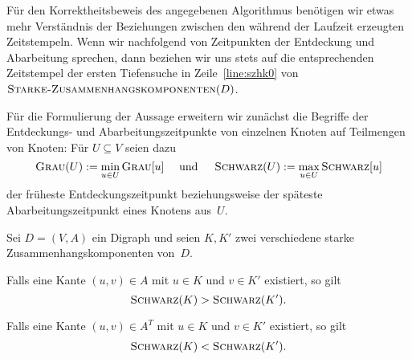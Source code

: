 \begin{bem}
Für den Korrektheitsbeweis des angegebenen Algorithmus benötigen wir etwas mehr Verständnis der Beziehungen zwischen den während der Laufzeit erzeugten Zeitstempeln.
Wenn wir nachfolgend von Zeitpunkten der Entdeckung und Abarbeitung sprechen, dann beziehen wir uns stets auf die entsprechenden Zeitstempel der ersten Tiefensuche in Zeile~\ref{line:szhk0} von $\mathop{\text{\textsc{Starke-Zusammenhangskomponenten}}}(D)$.

Für die Formulierung der Aussage erweitern wir zunächst die Begriffe der Entde\-ckungs- und Abarbeitungszeitpunkte von einzelnen Knoten auf Teilmengen von Knoten:
Für $U \subseteq V$ seien dazu
\[
\mathop{\text{\textsc{Grau}}}(U) := \min_{u \in U} \mathop{\text{\textsc{Grau}}}[u] \quad \text{ und } \quad\mathop{\text{\textsc{Schwarz}}}(U) := \max_{u \in U} \mathop{\text{\textsc{Schwarz}}}[u]
\]
der früheste Entdeckungszeitpunkt beziehungsweise der späteste Abarbeitungszeitpunkt eines Knotens aus~$U$.
\end{bem}

\begin{lem}
\label{lem:komponenten-zeitpunkte}
Sei $D=(V,A)$ ein Digraph und seien $K,K'$ zwei verschiedene starke Zusammenhangskomponenten von~$D$.
\begin{enumi}
 \item\label{lem:komponenten-zeitpunkte:primal} Falls eine Kante $(u,v) \in A$ mit $u \in K$ und $v \in K'$ existiert, so gilt
 \[
 \mathop{\text{\textsc{Schwarz}}}(K) > \mathop{\text{\textsc{Schwarz}}}(K').
 \]
 
 \item\label{lem:komponenten-zeitpunkte:transponiert} Falls eine Kante $(u,v) \in A^T$ mit $u \in K$ und $v \in K'$ existiert, so gilt
 \[
 \mathop{\text{\textsc{Schwarz}}}(K) < \mathop{\text{\textsc{Schwarz}}}(K').
 \]
\end{enumi}
\end{lem}

